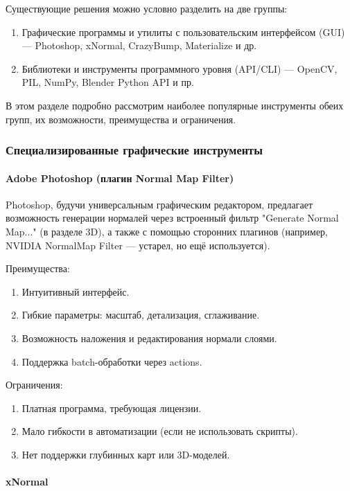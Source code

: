 Существующие решения можно условно разделить на две группы:
\begin{enumerate}
	\item Графические программы и утилиты с пользовательским интерфейсом (GUI) — Photoshop, xNormal, CrazyBump, Materialize и др.
	\item Библиотеки и инструменты программного уровня (API/CLI) — OpenCV, PIL, NumPy, Blender Python API и пр.
\end{enumerate}

В этом разделе подробно рассмотрим наиболее популярные инструменты обеих групп, их возможности, преимущества и ограничения.
\subsubsection{Специализированные графические инструменты}
\paragraph{Adobe Photoshop (плагин Normal Map Filter)}

Photoshop, будучи универсальным графическим редактором, предлагает возможность генерации нормалей через встроенный фильтр "Generate Normal Map..." (в разделе 3D), а также с помощью сторонних плагинов (например, NVIDIA NormalMap Filter — устарел, но ещё используется).

Преимущества:
\begin{enumerate}
	\item Интуитивный интерфейс.
	\item Гибкие параметры: масштаб, детализация, сглаживание.
	\item Возможность наложения и редактирования нормали слоями.
	\item Поддержка batch-обработки через actions.
\end{enumerate}

Ограничения:
\begin{enumerate}
	\item Платная программа, требующая лицензии.
	\item Мало гибкости в автоматизации (если не использовать скрипты).
	\item Нет поддержки глубинных карт или 3D-моделей.
\end{enumerate}
\paragraph{xNormal}

